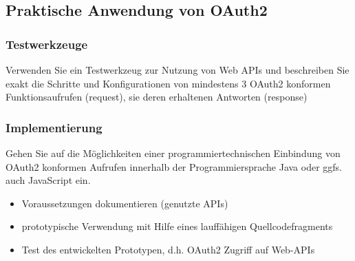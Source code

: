 \documentclass[notitlepage, hidelinks]{article}
\begin{document}
\subsection{Praktische Anwendung von OAuth2}
\subsubsection{Testwerkzeuge}
Verwenden Sie ein Testwerkzeug zur Nutzung von Web APIs und beschreiben Sie exakt die Schritte und Konfigurationen von mindestens 3 OAuth2 konformen Funktionsaufrufen (request), sie deren erhaltenen Antworten (response)

\subsubsection{Implementierung}
Gehen Sie auf die Möglichkeiten einer programmiertechnischen Einbindung von OAuth2 konformen Aufrufen innerhalb der Programmiersprache Java oder ggfs. auch JavaScript ein. 
\begin{itemize}
\item Voraussetzungen dokumentieren (genutzte APIs)
\item prototypische Verwendung mit Hilfe eines lauffähigen Quellcodefragments
\item Test des entwickelten Prototypen, d.h. OAuth2 Zugriff auf Web-APIs
\end{itemize}

\newpage




\end{document}
